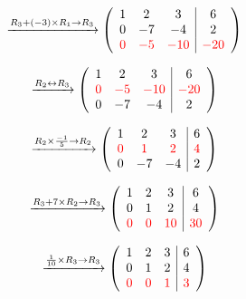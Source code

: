 \documentclass[a4paper,12pt]{article}
\begin{document}
\begin{frame}
        \[
        \xrightarrow{R_3 + (-3) \times R_1 \rightarrow R_3}
        \left( \begin{array}{ccc|c}
        1 & 2 & 3 & 6 \\
        0 & -7 & -4 & 2 \\
        \textcolor{red}{0} & \textcolor{red}{-5} & \textcolor{red}{-10} & \textcolor{red}{-20}
        \end{array} \right)
        \]
        
        \[
        \xrightarrow{R_2 \leftrightarrow R_3}
        \left( \begin{array}{ccc|c}
        1 & 2 & 3 & 6 \\
        \textcolor{red}{0} & \textcolor{red}{-5} & \textcolor{red}{-10} & \textcolor{red}{-20} \\
        0 & -7 & -4 & 2 
        \end{array} \right)
        \]
        
        \[
        \xrightarrow{R_2 \times \frac{-1}{5} \rightarrow R_2}
        \left( \begin{array}{ccc|c}
        1 & 2 & 3 & 6 \\
        \textcolor{red}{0} & \textcolor{red}{1} & \textcolor{red}{2} & \textcolor{red}{4} \\
        0 & -7 & -4 & 2 
        \end{array} \right)
        \]
        
        \[
        \xrightarrow{R_3 + 7 \times R_2 \rightarrow R_3}
        \left( \begin{array}{ccc|c}
        1 & 2 & 3 & 6 \\
        0 & 1 & 2 & 4 \\
        \textcolor{red}{0} & \textcolor{red}{0} & \textcolor{red}{10} & \textcolor{red}{30} \\
        \end{array} \right)
        \]
        
        \[
        \xrightarrow{\frac{1}{10} \times R_3 \rightarrow R_3}
        \left( \begin{array}{ccc|c}
        1 & 2 & 3 & 6 \\
        0 & 1 & 2 & 4 \\
        \textcolor{red}{0} & \textcolor{red}{0} & \textcolor{red}{1} & \textcolor{red}{3} \\
        \end{array} \right)
        \]
        

\end{frame}
\end{document}
